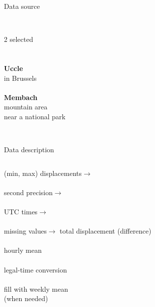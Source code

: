 \documentclass{beamer}
\begin{document}
\begin{frame}{Data source}
\begin{columns}[c]
		\\\vspace{.3em}2 selected
		\\~\\~
		\\\vspace{.25em}\textbf{Uccle}\\in Brussels\\~
		\\\vspace{.25em}\textbf{Membach}\\mountain area\\near a national park\\~
	\end{columns}
\end{frame}

\begin{frame}{Data description}
	\begin{columns}[T]
		(min, max) displacements\hfill$\rightarrow$\\~\\
		second precision\hfill$\rightarrow$\\~\\
		UTC times\hfill$\rightarrow$\\~\\
		missing values\hfill$\rightarrow$
		total displacement (difference)\\~\\
		hourly mean\\~\\
		legal-time conversion\\~\\
		fill with weekly mean\\(when needed)
	\end{columns}
\end{frame}
\end{document}
